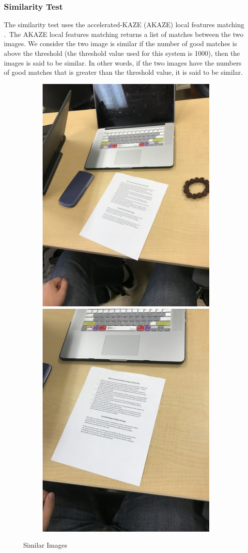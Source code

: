 \subsubsection{Similarity Test}
The similarity test uses the accelerated-KAZE (AKAZE) local features matching \cite{akaze}.~The AKAZE local features matching returns a list of matches between the two images. We consider the two image is similar if the number of good matches is above the threshold (the threshold value used for this system is 1000), then the images is said to be similar. In other words, if the two images have the numbers of good matches that is greater than the threshold value, it is said to be similar.

\begin{figure}
  \begin{subfigure}{\linewidth}
	  \includegraphics[width=.4\linewidth]{similar1.JPG}\hfill
	  \includegraphics[width=.4\linewidth]{similar2.JPG}
  \end{subfigure}\par\medskip  
  
    \caption{Similar Images}
	\label{similarImages}
\end{figure}

